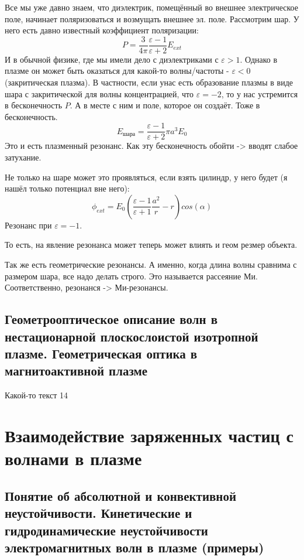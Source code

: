 \documentclass[10pt, a4paper]{article}
\let\stdsection\section
\renewcommand\section{\newpage\stdsection}
\begin{document}
Все мы уже давно знаем, что диэлектрик, помещённый во внешнее электрическое поле, начинает поляризоваться и возмущать внешнее эл. поле. Рассмотрим шар. У него есть давно известный коэффициент поляризации:
\begin{equation}
	P=\frac{3}{4\pi}\frac{\varepsilon - 1}{\varepsilon + 2} E_{ext}
\end{equation}
И в обычной физике, где мы имели дело с диэлектриками с $\varepsilon>1$. Однако в плазме он может быть оказаться для какой-то волны/частоты - $\varepsilon<0$ (закритическая плазма). В частности, если унас есть образование плазмы в виде шара с закритической для волны концентрацией, что $\varepsilon = -2$, то у нас устремится в бесконечность $P$. А в месте с ним и поле, которое он создаёт. Тоже в бесконечность.
\begin{equation}
	E_{\text{шара}}=\frac{\varepsilon - 1}{\varepsilon + 2} \pi a^3 E_0
\end{equation}
Это и есть плазменный резонанс. Как эту бесконечность обойти -> вводят слабое затухание.



Не только на шаре может это проявляться, если взять цилиндр, у него будет (я нашёл только потенциал вне него):
\begin{equation}
	\phi_{ext}=E_0(\frac{\varepsilon-1}{\varepsilon+1} \frac{a^2}{r} - r) cos(\alpha)
\end{equation}
Резонанс при $\varepsilon=-1$.

То есть, на явление резонанса может теперь может влиять и геом резмер объекта.

Так же есть геометрические резонансы. А именно, когда длина волны сравнима с размером шара, все надо делать строго. Это называется рассеяние Ми. Соответственно, резонанся -> Ми-резонансы.

\subsection{Геометрооптическое описание волн в нестационарной плоскослоистой изотропной плазме. Геометрическая оптика в магнитоактивной плазме}

Какой-то текст 14

\section{Взаимодействие заряженных частиц с волнами в плазме}

\subsection{Понятие об абсолютной и конвективной неустойчивости. Кинетические и гидродинамические неустойчивости электромагнитных волн в плазме (примеры)}
\end{document}
